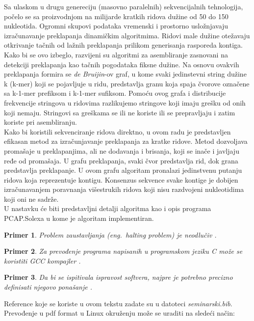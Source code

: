 \documentclass[a4paper]{article}
\newtheorem{primer}{Primer}[section]
\begin{document}
{\indent Sa ulaskom u drugu genereciju (masovno paralelnih) sekvencijalnih tehnologija, počelo se sa proizvodnjom na milijarde kratkih ridova dužine od 50 do 150 nukleotida. Ogromni skupovi podataka vremenski i prostorno usložnjavaju izra\-čuna\-va\-nje preklapanja dinamičkim algoritmima. Ridovi male dužine otežavaju otkrivanje tačnih od lažnih preklapanja prilikom generisanja rasporeda kontiga. Kako bi se ovo izbeglo, razvijeni su algoritmi za asembliranje zasnovani na detekciji preklapanja kao tačnih pogodataka fiksne dužine. Na osnovu ovakvih preklapanja formira se \textit{de Bruijin}-ov graf, u kome svaki jedinstevni string dužine k (k-mer) koji se pojavljuje u ridu, predstavlja granu koja spaja čvorove označene sa k-1-mer prefiksom i k-1-mer sufiksom. Pomoću ovog grafa i distribucije frekvencije stringova u ridovima razlikujemo stringove koji imaju grešku od onih koji nemaju. Stringovi sa greškama se ili ne koriste ili se prepravljaju i zatim koriste pri asembliranju.  \\
\indent Kako bi koristili sekvenciranje ridova direktno, u ovom radu je predstavljen efikasan metod za izračunjavanje preklapanja za kratke ridove. Metod dozvoljava promašaje u preklapanjima, ali ne dodavanja i brisanja, koji se inače i javljaju ređe od promašaja. U grafu preklapanja, svaki čvor predstavlja rid, dok grana predstavlja preklapanje. U ovom grafu algoritam pronalazi jedinstvenu putanju ridova koja reprezentuje kontigu. Konsenzus sekvence svake kontige je dobijen izračunavanjem poravnanja višestrukih ridova koji nisu razdvojeni nukleotidima koji oni ne sadrže. \\
\indent U nastavku će biti predstavljni detalji algoritma kao i opis programa PCAP.Solexa u kome je algoritam implementiran.
\iffalse
\begin{primer}
Problem zaustavljanja (eng.~{\em halting problem}) je neodlučiv \cite{haltingproblem}.
\end{primer}

\begin{primer}
Za prevođenje programa napisanih u programskom jeziku C može se koristiti GCC kompajler \cite{gcc}.
\end{primer}

\begin{primer}
 Da bi se ispitivala ispravost softvera, najpre je potrebno precizno definisati njegovo ponašanje \cite{laski2009software}. 
\end{primer}
Reference koje se koriste u ovom tekstu zadate su u datoteci {\em seminarski.bib}. Prevođenje u pdf format u Linux okruženju može se uraditi na sledeći način:

}
\end{document}
